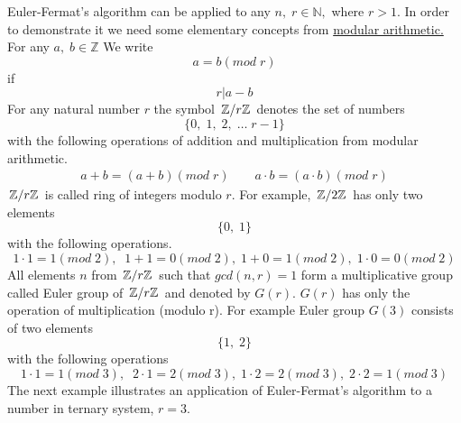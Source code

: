 \documentclass[color=black,11pt]{elegantpaper}
\begin{document}
Euler-Fermat's algorithm can be applied to any $n,\;r \in \mathbb{N},$ where $r>1.$ In order to demonstrate it  we need some elementary concepts from \href{https://en.wikipedia.org/wiki/Modular_arithmetic}{modular arithmetic.} For any $a,\;b \in \mathbb{Z}$ We write
$$
a = b (mod\; r)
$$
if 
$$
r | a-b 
$$
For any natural number $r$ the symbol $\left. \mathbb{Z}\middle/ r\mathbb{Z} \right.$ denotes the set of numbers
$$
\{0,\;1,\;2,\;\dots \; r-1 \}
$$
with the following operations of addition and multiplication from modular arithmetic.
\begin{eqnarray*}
a + b = (a+b) (mod\; r)\qquad a \cdot b = (a\cdot b) (mod\; r)
\end{eqnarray*}
$\left. \mathbb{Z}\middle/ r\mathbb{Z} \right.$ is called ring of integers modulo $r.$
For example, $\left. \mathbb{Z}\middle/ 2\mathbb{Z} \right.$ has only two elements
$$
\{0,\;1\}
$$
with the following operations.
$$
1\cdot 1 = 1 (mod\;2),\;\; 1+1 = 0 (mod\; 2), \; 1+ 0 = 1 (mod\; 2),\; 1 \cdot 0 = 0 (mod\;2)
$$
All elements $n$ from $\left. \mathbb{Z}\middle/ r\mathbb{Z} \right.$ such that $gcd(n,r)=1$ form a multiplicative group called Euler group of $\left. \mathbb{Z}\middle/ r\mathbb{Z} \right.$ and denoted by $G(r).$ $G(r)$ has only the operation of multiplication (modulo r). For example Euler group $G(3)$ consists of two elements
$$
\{1,\;2\}
$$
with the following operations
$$
1 \cdot 1 = 1(mod\;3),\;\;2 \cdot 1 = 2(mod\;3),\;1 \cdot 2 = 2(mod\;3),\;2 \cdot 2 = 1(mod\;3)
$$
 The next example illustrates an application of Euler-Fermat's algorithm to a number in ternary system, $r=3.$
\end{document}
